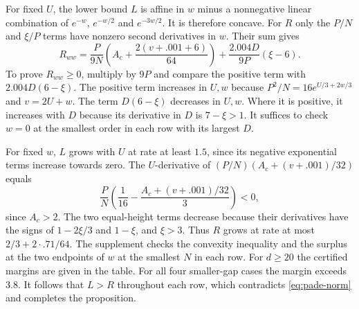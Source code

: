 For fixed \(U\), the lower bound \(L\) is affine in \(w\)
minus a nonnegative linear combination of \(e^{-w}\),
\(e^{-w/2}\) and \(e^{-3w/2}\). It is therefore concave.
For \(R\) only the \(P/N\) and \(\xi/P\) terms have nonzero
second derivatives in \(w\). Their sum gives
\[
 R_{ww}=
 \frac{P}{9N}\left(A_c+\frac{2(v+.001+6)}{64}\right)
      +\frac{2.004D}{9P}(\xi-6).
\]
To prove \(R_{ww}\ge0\), multiply by \(9P\) and compare the
positive term with \(2.004D(6-\xi)\).
The positive term increases in \(U,w\) because
\(P^2/N=16e^{U/3+2w/3}\) and \(v=2U+w\).
The term \(D(6-\xi)\) decreases in \(U,w\).
Where it is positive, it increases with \(D\) because its
derivative in \(D\) is \(7-\xi>1\).
It suffices to check \(w=0\) at the smallest order in each row
with its largest \(D\).

For fixed \(w\), \(L\) grows with \(U\) at rate at least \(1.5\),
since its negative exponential terms increase towards zero.
The \(U\)-derivative of \((P/N)(A_c+(v+.001)/32)\) equals
\[
 \frac PN\left(\frac1{16}-\frac{A_c+(v+.001)/32}{3}\right)<0,
\]
since \(A_c>2\).
The two equal-height terms decrease because their derivatives
have the signs of \(1-2\xi/3\) and \(1-\xi\), and \(\xi>3\).
Thus \(R\) grows at rate at most \(2/3+2\cdot .71/64\).
The supplement checks the convexity inequality and the surplus
at the two endpoints of \(w\) at the smallest \(N\) in each row.
For \(d\ge20\) the certified margins are given in the table.
For all four smaller-gap cases the margin exceeds \(3.8\).
It follows that \(L>R\) throughout each row, which contradicts
\eqref{eq:pade-norm} and completes the proposition.

